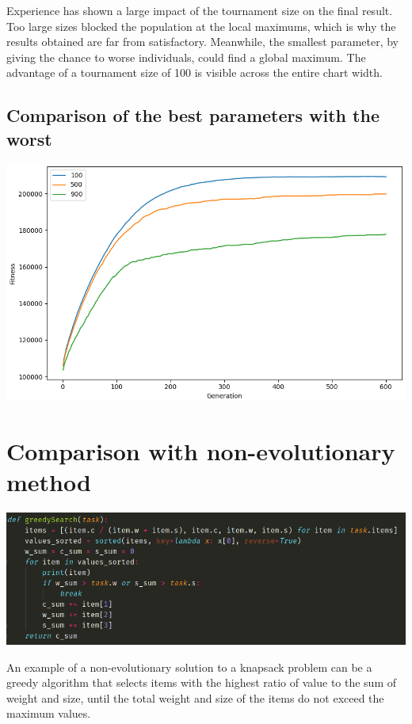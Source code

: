 \documentclass[12pt]{article}
\begin{document}
Experience has shown a large impact of the tournament size on the final result. Too large sizes blocked the population at the local maximums, which is why the results obtained are far from satisfactory. Meanwhile, the smallest parameter, by giving the chance to worse individuals, could find a global maximum. The advantage of a tournament size of 100 is visible across the entire chart width.

\subsection{Comparison of the best parameters with the worst}
\hspace*{-1.5cm}
\includegraphics[scale=0.55]{tournament}

\section{Comparison with non-evolutionary method}
\begin{center}
	\includegraphics[scale=0.5]{greedy}
\end{center}

An example of a non-evolutionary solution to a knapsack problem can be a greedy algorithm that selects items with the highest ratio of value to the sum of weight and size, until the total weight and size of the items do not exceed the maximum values.
\end{document}
